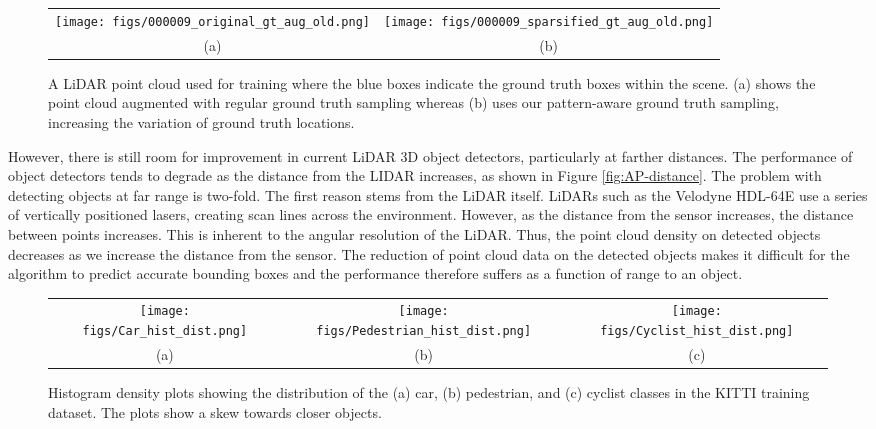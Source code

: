 \documentclass[10pt, conference, compsocconf]{IEEEtran}
\begin{document}
\begin{figure}[ht!]
\centering
\begin{tabular}{cc}
    \texttt{[image: figs/000009\_original\_gt\_aug\_old.png]} &
    \texttt{[image: figs/000009\_sparsified\_gt\_aug\_old.png]}\\
    (a) & (b)
\end{tabular}
\caption{A LiDAR point cloud used for training where the blue boxes indicate the ground truth boxes within the scene. (a) shows the point cloud augmented with regular ground truth sampling whereas (b) uses our pattern-aware ground truth sampling, increasing the variation of ground truth locations.}
\label{fig:sparse-ex}
\end{figure}

However, there is still room for improvement in current LiDAR 3D object detectors, particularly at farther distances. The performance of object detectors tends to degrade as the distance from the LIDAR increases, as shown in Figure \ref{fig:AP-distance}. The problem with detecting objects at far range is two-fold. The first reason stems from the LiDAR itself. LiDARs such as the Velodyne HDL-64E use a series of vertically positioned lasers, creating scan lines across the environment. However, as the distance from the sensor increases, the distance between points increases. This is inherent to the angular resolution of the LiDAR. Thus, the point cloud density on detected objects decreases as we increase the distance from the sensor. The reduction of point cloud data on the detected objects makes it difficult for the algorithm to predict accurate bounding boxes and the performance therefore suffers as a function of range to an object.

\begin{figure*}[ht!]
\centering

\begin{tabular}{ccc}
    \texttt{[image: figs/Car\_hist\_dist.png]} &
    \texttt{[image: figs/Pedestrian\_hist\_dist.png]} &
    \texttt{[image: figs/Cyclist\_hist\_dist.png]}\\
    (a) & (b) & (c)
\end{tabular}
\caption{Histogram density plots showing the distribution of the (a) car, (b) pedestrian, and (c) cyclist classes in the KITTI training dataset. The plots show a skew towards closer objects.}
\label{fig:hist}
\end{figure*}
\end{document}
